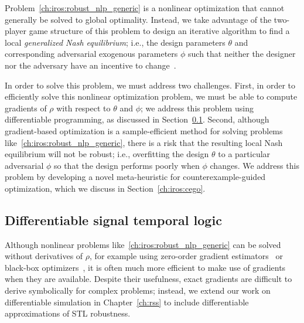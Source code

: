 Problem~\eqref{ch:iros:robust_nlp_generic} is a nonlinear optimization that cannot generally be solved to global optimality. Instead, we take advantage of the two-player game structure of this problem to design an iterative algorithm to find a local \textit{generalized Nash equilibrium}; i.e., the design parameters $\theta$ and corresponding adversarial exogenous parameters $\phi$ such that neither the designer nor the adversary have an incentive to change~\cite{facchineiGeneralizedNashEquilibrium2007}.

In order to solve this problem, we must address two challenges. First, in order to efficiently solve this nonlinear optimization problem, we must be able to compute gradients of $\rho$ with respect to $\theta$ and $\phi$; we address this problem using differentiable programming, as discussed in Section~\ref{ch:iros:diffstl}. Second, although gradient-based optimization is a sample-efficient method for solving problems like~\eqref{ch:iros:robust_nlp_generic}, there is a risk that the resulting local Nash equilibrium will not be robust; i.e., overfitting the design $\theta$ to a particular adversarial $\phi$ so that the design performs poorly when $\phi$ changes. We address this problem by developing a novel meta-heuristic for counterexample-guided optimization, which we discuss in Section~\ref{ch:iros:cego}.

\subsection{Differentiable signal temporal logic}\label{ch:iros:diffstl}

Although nonlinear problems like~\eqref{ch:iros:robust_nlp_generic} can be solved without derivatives of $\rho$, for example using zero-order gradient estimators~\cite{suh2021_bundled_gradients} or black-box optimizers~\cite{corsoSurveyAlgorithmsBlackBox2021}, it is often much more efficient to make use of gradients when they are available. Despite their usefulness, exact gradients are difficult to derive symbolically for complex problems; instead, we extend our work on differentiable simulation in Chapter~\ref{ch:rss} to include differentiable approximations of STL robustness.


